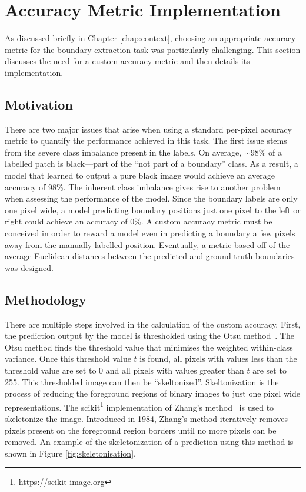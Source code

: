 \section{Accuracy Metric Implementation}
\label{sec:accimplementation}

As discussed briefly in Chapter \ref{chap:context}, choosing an appropriate accuracy metric for the boundary extraction task was particularly challenging. This section discusses the need for a custom accuracy metric and then details its implementation.

\subsection{Motivation}

There are two major issues that arise when using a standard per-pixel accuracy metric to quantify the performance achieved in this task. The first issue stems from the severe class imbalance present in the labels. On average, ${\sim}$98\% of a labelled patch is black---part of the ``not part of a boundary'' class. As a result, a model that learned to output a pure black image would achieve an average accuracy of 98\%. The inherent class imbalance gives rise to another problem when assessing the performance of the model. Since the boundary labels are only one pixel wide, a model predicting boundary positions just one pixel to the left or right could achieve an accuracy of 0\%. A custom accuracy metric must be conceived in order to reward a model even in predicting a boundary a few pixels away from the manually labelled position. Eventually, a metric based off of the average Euclidean distances between the predicted and ground truth boundaries was designed.

\subsection{Methodology}

There are multiple steps involved in the calculation of the custom accuracy. First, the prediction output by the model is thresholded using the Otsu method~\cite{otsu}. The Otsu method finds the threshold value that minimises the weighted within-class variance. Once this threshold value $t$ is found, all pixels with values less than the threshold value are set to 0 and all pixels with values greater than $t$ are set to 255. This thresholded image can then be ``skeltonized''. Skeltonization is the process of reducing the foreground regions of binary images to just one pixel wide representations. The scikit\footnote{\url{https://scikit-image.org}} implementation of Zhang's method~\cite{zhang} is used to skeletonize the image. Introduced in 1984, Zhang's method iteratively removes pixels present on the foreground region borders until no more pixels can be removed. An example of the skeletonization of a prediction using this method is shown in Figure \ref{fig:skeletonisation}.

